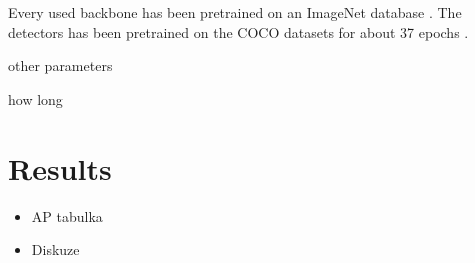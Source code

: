 Every used backbone has been pretrained on an ImageNet database \cite{imagenet}.
The detectors has been pretrained on the COCO datasets \cite{coco} for about
37 epochs \cite{detectron}.

other parameters

how long



\section{Results}
\begin{itemize}
	\item AP tabulka
	\item Diskuze
\end{itemize}

